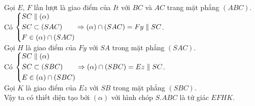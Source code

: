 \begin{bt}
{\begin{enumerate}
			Gọi $E$, $F$ lần lượt là giao điểm của $It$ với $BC$ và $AC$ trang mặt phẳng $(ABC)$.\\
			Có $\left\{\begin{aligned}&SC\parallel(\alpha)\\&SC\subset(SAC)\\&F\in(\alpha)\cap(SAC)\end{aligned}\right.\Rightarrow (\alpha)\cap(SAC)=Fy\parallel SC$.\\
			Gọi $H$ là giao điểm của $Fy$ với $SA$ trong mặt phẳng $(SAC)$.\\
			Có $\left\{\begin{aligned}&SC\parallel(\alpha)\\&SC\subset(SBC)\\&E\in(\alpha)\cap(SBC)\end{aligned}\right.\Rightarrow (\alpha)\cap(SBC)=Ez\parallel SC$.\\
			Gọi $K$ là giao điểm của $Ez$ với $SB$ trong mặt phẳng $(SBC)$.\\
			Vậy ta có thiết diện tạo bởi $(\alpha)$ với hình chóp $S.ABC$ là tứ giác $EFHK$.
	\end{enumerate}}
\end{bt}
